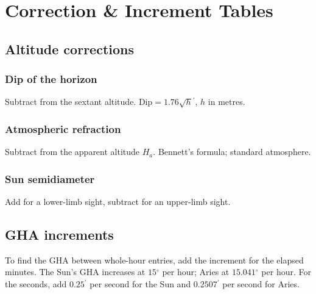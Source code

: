 \documentclass[10pt,letterpaper,twoside]{book}
\newcommand{\dg}{\ensuremath{{}^{\circ}}}
\newcommand{\pr}{\ensuremath{{}^{\prime}}}
\begin{document}
\part{Correction \& Increment Tables}
\chapter{Altitude corrections}

\section{Dip of the horizon}
Subtract from the sextant altitude. $\text{Dip}=1.76\sqrt{h}\pr$, $h$ in metres.
\begin{center}\end{center}

\section{Atmospheric refraction}
Subtract from the apparent altitude $H_a$. Bennett's formula; standard atmosphere.
\begin{center}\end{center}

\section{Sun semidiameter}
Add for a lower-limb sight, subtract for an upper-limb sight.
\begin{center}\end{center}

\chapter{GHA increments}

To find the GHA between whole-hour entries, add the increment for the elapsed
minutes. The Sun's GHA increases at $15\dg$ per hour; Aries at $15.041\dg$ per
hour. For the seconds, add $0.25\pr$ per second for the Sun and $0.2507\pr$ per
second for Aries.
\begin{center}\end{center}

\backmatter
\end{document}
